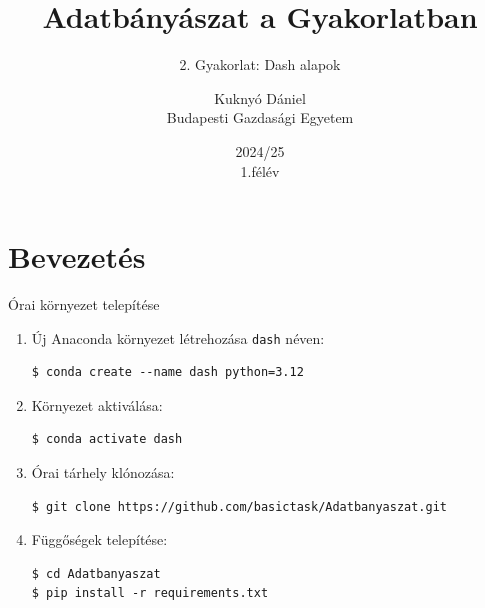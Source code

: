 \documentclass[english, aspectratio=169]{beamer}
\makeatletter
\newcommand\makebeamertitle{\frame{\maketitle}}
\let\origtableofcontents=\tableofcontents
\def\tableofcontents{\@ifnextchar[{\origtableofcontents}{\gobbletableofcontents}}
\def\gobbletableofcontents#1{\origtableofcontents}
\makeatother
\begin{document}
	\section{Bevezetés}
	\title[]{Adatbányászat a Gyakorlatban}
	\subtitle{2. Gyakorlat: Dash alapok}
	\author[Kuknyó Dániel]{Kuknyó Dániel\\Budapesti Gazdasági Egyetem}
	\date{2024/25\\1.félév}
	\makebeamertitle
	
	\begin{frame}
		\tableofcontents{}
	\end{frame}
	
	\begin{frame}
		\tableofcontents[currentsection]
	\end{frame}
	
	\begin{frame}[fragile]{Órai környezet telepítése}
		\begin{enumerate}
			\item Új Anaconda környezet létrehozása \texttt{dash} néven:
			\begin{lstlisting}
$ conda create --name dash python=3.12
			\end{lstlisting}
			\item Környezet aktiválása:
			\begin{lstlisting}
$ conda activate dash
			\end{lstlisting}
			\item Órai tárhely klónozása:
			\begin{lstlisting}
$ git clone https://github.com/basictask/Adatbanyaszat.git
			\end{lstlisting}
			\item Függőségek telepítése:
			\begin{lstlisting}
$ cd Adatbanyaszat
$ pip install -r requirements.txt
			\end{lstlisting}
		\end{enumerate}
	\end{frame}
	
\end{document}
